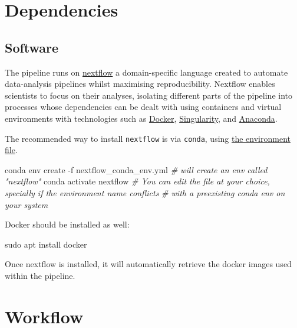 \documentclass[
  openany]{book}
\newenvironment{Shaded}{\begin{snugshade}}{\end{snugshade}}
\newcommand{\AttributeTok}[1]{\textcolor[rgb]{0.77,0.63,0.00}{#1}}
\newcommand{\CommentTok}[1]{\textcolor[rgb]{0.56,0.35,0.01}{\textit{#1}}}
\newcommand{\ExtensionTok}[1]{#1}
\newcommand{\FunctionTok}[1]{\textcolor[rgb]{0.00,0.00,0.00}{#1}}
\newcommand{\NormalTok}[1]{#1}
\begin{document}
\hypertarget{dependencies}{%
\chapter{Dependencies}\label{dependencies}}

\hypertarget{software}{%
\section{Software}\label{software}}

The pipeline runs on \href{https://www.nextflow.io/}{nextflow} a domain-specific language created to automate data-analysis pipelines whilst maximising reproducibility.
Nextflow enables scientists to focus on their analyses, isolating different parts of the pipeline into processes whose dependencies can be dealt with using containers and virtual environments with technologies such as \href{https://www.docker.com/}{Docker}, \href{https://singularity.hpcng.org/}{Singularity}, and \href{https://www.anaconda.com/products/individual}{Anaconda}.

The recommended way to install \texttt{nextflow} is via \texttt{conda}, using \href{https://github.com/bio-TAGI/Hackathon/blob/main/nextflow_conda_env.yml}{the environment file}.

\begin{Shaded}
\begin{Highlighting}[]
\ExtensionTok{conda}\NormalTok{ env create }\AttributeTok{{-}f}\NormalTok{ nextflow\_conda\_env.yml }\CommentTok{\# will create an env called "nextflow"}
\ExtensionTok{conda}\NormalTok{ activate nextflow}
\CommentTok{\# You can edit the file at your choice, specially if the environment name conflicts}
\CommentTok{\# with a preexisting conda env on your system}
\end{Highlighting}
\end{Shaded}

Docker should be installed as well:

\begin{Shaded}
\begin{Highlighting}[]
\FunctionTok{sudo}\NormalTok{ apt install docker}
\end{Highlighting}
\end{Shaded}

Once nextflow is installed, it will automatically retrieve the docker images used within the pipeline.

\hypertarget{workflow}{%
\chapter{Workflow}\label{workflow}}
\end{document}
